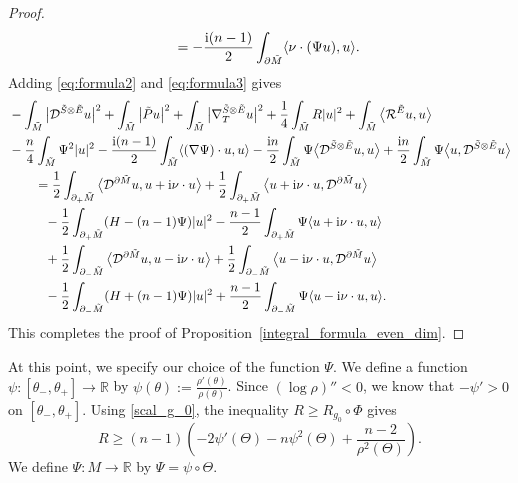 \documentclass[pdftex]{sigma}
\numberwithin{equation}{section}
\newcommand{\R}{\mathbb{R}}
\begin{document}
\begin{proof}
\begin{align}
&\qquad= -\frac{{\rm i}(n-1)}{2} \int_{\partial \tilde{M}} \langle \nu \cdot (\Psi u),u \rangle.\label{eq:formula3}
\end{align}
Adding \eqref{eq:formula2} and \eqref{eq:formula3} gives
\begin{align*}
&- \int_{\tilde{M}} \big|\mathcal{D}^{\tilde{S} \otimes \tilde{E}} u\big|^2 + \int_{\tilde{M}} \big|\tilde{P} u\big|^2 + \int_{\tilde{M}} \big|\nabla_T^{\tilde{S} \otimes \tilde{E}} u\big|^2 + \frac{1}{4} \int_{\tilde{M}} R |u|^2
+ \int_{\tilde{M}} \big\langle \mathcal{R}^{\tilde{E}} u,u \big\rangle \\
&- \frac{n}{4} \int_{\tilde{M}} \Psi^2 |u|^2 - \frac{{\rm i}(n-1)}{2} \int_{\tilde{M}} \langle (\nabla \Psi) \cdot u,u \rangle
- \frac{{\rm i}n}{2} \int_{\tilde{M}} \Psi \big\langle \mathcal{D}^{\tilde{S} \otimes \tilde{E}} u,u \big\rangle + \frac{{\rm i}n}{2} \int_{\tilde{M}} \Psi \big\langle u,\mathcal{D}^{\tilde{S} \otimes \tilde{E}} u \big\rangle\\
&\qquad= \frac{1}{2} \int_{\partial_+ \tilde{M}} \big\langle \mathcal{D}^{\partial \tilde{M}} u,u + {\rm i} \nu \cdot u \big\rangle + \frac{1}{2} \int_{\partial_+ \tilde{M}} \big\langle u + {\rm i} \nu \cdot u,\mathcal{D}^{\partial \tilde{M}} u \big\rangle \\
&\phantom{\qquad=}{} - \frac{1}{2} \int_{\partial_+ \tilde{M}} (H-(n-1)\Psi) |u|^2 - \frac{n-1}{2} \int_{\partial_+ \tilde{M}} \Psi \langle u + {\rm i} \nu \cdot u,u \rangle \\
&\phantom{\qquad=}{} + \frac{1}{2} \int_{\partial_- \tilde{M}} \big\langle \mathcal{D}^{\partial \tilde{M}} u,u - {\rm i} \nu \cdot u \big\rangle + \frac{1}{2} \int_{\partial_- \tilde{M}} \big\langle u - {\rm i} \nu \cdot u,\mathcal{D}^{\partial \tilde{M}} u \big\rangle \\
&\phantom{\qquad=}{} - \frac{1}{2} \int_{\partial_- \tilde{M}} (H+(n-1)\Psi) |u|^2 + \frac{n-1}{2} \int_{\partial_- \tilde{M}} \Psi \langle u - {\rm i} \nu \cdot u,u \rangle.
\end{align*}
This completes the proof of Proposition~\ref{integral_formula_even_dim}.
\end{proof}

At this point, we specify our choice of the function $\Psi$. We define a function $\psi\colon [\theta_-, \theta_+] \to \R$ by $\psi(\theta) := \frac{\rho'(\theta)}{\rho(\theta)}$.
Since $(\log \rho)''<0$, we know that $-\psi' > 0$ on $[\theta_-,\theta_+]$.
Using \eqref{scal_g_0}, the inequality $R \geq R_{g_0} \circ \Phi$ gives
\begin{equation} \label{ineq_for_scal_even_dim}
R \geq (n-1) \left( -2 \psi'(\Theta) - n \psi^2(\Theta) + \frac{n-2}{\rho^2(\Theta)} \right).
\end{equation}
We define $\Psi\colon M \to \R$ by $\Psi = \psi \circ \Theta$.
\end{document}
